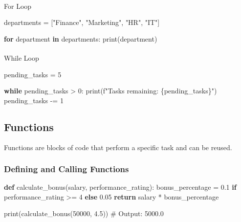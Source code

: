 \documentclass[
  letterpaper,
  DIV=11,
  numbers=noendperiod]{scrreprt}
\makeatletter
\let\oldparagraph\paragraph
\renewcommand{\paragraph}{
    \@ifstar
      \xxxParagraphStar
      \xxxParagraphNoStar
  }
\newcommand{\xxxParagraphStar}[1]{\oldparagraph*{#1}\mbox{}}
\newcommand{\xxxParagraphNoStar}[1]{\oldparagraph{#1}\mbox{}}
\newenvironment{Shaded}{\begin{snugshade}}{\end{snugshade}}
\newcommand{\BuiltInTok}[1]{\textcolor[rgb]{0.00,0.23,0.31}{#1}}
\newcommand{\CommentTok}[1]{\textcolor[rgb]{0.37,0.37,0.37}{#1}}
\newcommand{\ControlFlowTok}[1]{\textcolor[rgb]{0.00,0.23,0.31}{\textbf{#1}}}
\newcommand{\DecValTok}[1]{\textcolor[rgb]{0.68,0.00,0.00}{#1}}
\newcommand{\FloatTok}[1]{\textcolor[rgb]{0.68,0.00,0.00}{#1}}
\newcommand{\KeywordTok}[1]{\textcolor[rgb]{0.00,0.23,0.31}{\textbf{#1}}}
\newcommand{\NormalTok}[1]{\textcolor[rgb]{0.00,0.23,0.31}{#1}}
\newcommand{\OperatorTok}[1]{\textcolor[rgb]{0.37,0.37,0.37}{#1}}
\newcommand{\SpecialCharTok}[1]{\textcolor[rgb]{0.37,0.37,0.37}{#1}}
\newcommand{\SpecialStringTok}[1]{\textcolor[rgb]{0.13,0.47,0.30}{#1}}
\newcommand{\StringTok}[1]{\textcolor[rgb]{0.13,0.47,0.30}{#1}}
\makeatother
\begin{document}
\paragraph{For Loop}\label{for-loop}

\begin{Shaded}
\begin{Highlighting}[]
\NormalTok{departments }\OperatorTok{=}\NormalTok{ [}\StringTok{"Finance"}\NormalTok{, }\StringTok{"Marketing"}\NormalTok{, }\StringTok{"HR"}\NormalTok{, }\StringTok{"IT"}\NormalTok{]}

\ControlFlowTok{for}\NormalTok{ department }\KeywordTok{in}\NormalTok{ departments:}
    \BuiltInTok{print}\NormalTok{(department)}
\end{Highlighting}
\end{Shaded}

\paragraph{While Loop}\label{while-loop}

\begin{Shaded}
\begin{Highlighting}[]
\NormalTok{pending\_tasks }\OperatorTok{=} \DecValTok{5}

\ControlFlowTok{while}\NormalTok{ pending\_tasks }\OperatorTok{\textgreater{}} \DecValTok{0}\NormalTok{:}
    \BuiltInTok{print}\NormalTok{(}\SpecialStringTok{f"Tasks remaining: }\SpecialCharTok{\{}\NormalTok{pending\_tasks}\SpecialCharTok{\}}\SpecialStringTok{"}\NormalTok{)}
\NormalTok{    pending\_tasks }\OperatorTok{{-}=} \DecValTok{1}
\end{Highlighting}
\end{Shaded}

\subsection{Functions}\label{functions}

Functions are blocks of code that perform a specific task and can be
reused.

\subsubsection{Defining and Calling
Functions}\label{defining-and-calling-functions}

\begin{Shaded}
\begin{Highlighting}[]
\KeywordTok{def}\NormalTok{ calculate\_bonus(salary, performance\_rating):}
\NormalTok{    bonus\_percentage }\OperatorTok{=} \FloatTok{0.1} \ControlFlowTok{if}\NormalTok{ performance\_rating }\OperatorTok{\textgreater{}=} \DecValTok{4} \ControlFlowTok{else} \FloatTok{0.05}
    \ControlFlowTok{return}\NormalTok{ salary }\OperatorTok{*}\NormalTok{ bonus\_percentage}

\BuiltInTok{print}\NormalTok{(calculate\_bonus(}\DecValTok{50000}\NormalTok{, }\FloatTok{4.5}\NormalTok{))  }\CommentTok{\# Output: 5000.0}
\end{Highlighting}
\end{Shaded}
\end{document}
